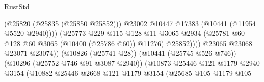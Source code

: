 \begin{lexlean}{RustStd}
\begin{coremodule}
                                                          (@25820 (@25835 (@25850 @25852)))
                                                          @23002
                                                          @10447
                                                          @17383
                                                          (@10441 (@11954 @5520 @2940))))
                                                      (@25773
                                                        @229
                                                        @115
                                                        @128
                                                        @11
                                                        @3065
                                                        @2934
                                                        (@25781
                                                          @60
                                                          @128
                                                          @60
                                                          @3065
                                                          (@10400 (@25786 @60))
                                                          @11276)
                                                        @25852))))
                                                @23065
                                                @23068
                                                @23071
                                                @23074))
                                            (@10826 (@25741 @28))
                                            (@10441 (@25745 @526 @746))
                                            (@10296 (@25752 @746 @91 @3087 @2940))
                                            (@10873
                                              @25446
                                              @121
                                              @1179
                                              @2940
                                              @3154
                                              (@10882
                                                @25446
                                                @2668
                                                @121
                                                @1179
                                                @3154
                                                (@25685
                                                  @105
                                                  @1179
                                                  @105

\end{coremodule}
\end{lexlean}
